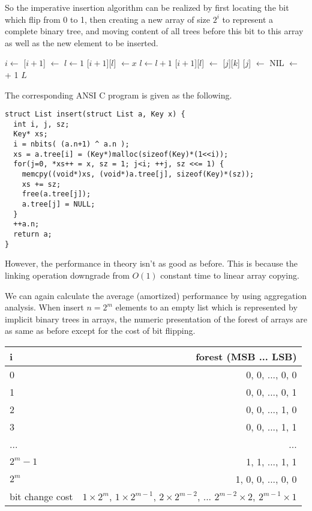 \documentclass[UTF8]{article}
\begin{document}
So the imperative insertion algorithm can be realized by first locating the bit which
flip from 0 to 1, then creating a new array of size $2^i$ to represent a complete
binary tree, and moving content of all trees before this bit to this array as well
as the new element to be inserted.

\begin{algorithmic}
  \State $i \gets $ 
  \State {}[$i+1$] $\gets $ 
  \State $l \gets 1$
  \State  {}[$i+1$][$l$]  $\gets x$
      \State $l \gets l + 1$
      \State {}[$i+1$][$l$]  $\gets$ [$j$][$k$]
    \EndFor
    \State {}[$j$] $\gets$ NIL
  \EndFor
  \State {} $\gets$  + 1
  \State \Return $L$
\EndFunction
\end{algorithmic}

The corresponding ANSI C program is given as the following.

\begin{lstlisting}
struct List insert(struct List a, Key x) {
  int i, j, sz;
  Key* xs;
  i = nbits( (a.n+1) ^ a.n );
  xs = a.tree[i] = (Key*)malloc(sizeof(Key)*(1<<i));
  for(j=0, *xs++ = x, sz = 1; j<i; ++j, sz <<= 1) {
    memcpy((void*)xs, (void*)a.tree[j], sizeof(Key)*(sz));
    xs += sz;
    free(a.tree[j]);
    a.tree[j] = NULL;
  }
  ++a.n;
  return a;
}
\end{lstlisting}

However, the performance in theory isn't as good as before. This is because the
linking operation downgrade from $O(1)$ constant time to linear array copying.

We can again calculate the average (amortized) performance by using aggregation
analysis. When insert $n = 2^m$ elements to an empty list which is represented
by implicit binary trees in arrays, the numeric presentation of the forest of
arrays are as same as before except for the cost of bit flipping.

\begin{tabular}{l | r}
  \hline
  i & forest (MSB ... LSB) \\
  \hline
  0 & 0, 0, ..., 0, 0 \\
  1 & 0, 0, ..., 0, 1 \\
  2 & 0, 0, ..., 1, 0 \\
  3 & 0, 0, ..., 1, 1 \\
  ... & ... \\
  $2^m-1$ & 1, 1, ..., 1, 1 \\
  $2^m$ & 1, 0, 0, ..., 0, 0 \\
  \hline
  bit change cost & $1 \times 2^m$, $1 \times 2^{m-1}$, $2 \times 2^{m-2}$, ... $2^{m-2} \times 2$, $2^{m-1} \times 1$ \\
  \hline
\end{tabular}
\end{document}
